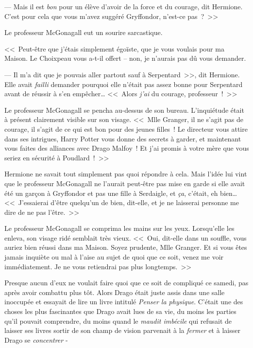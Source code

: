 --- Mais il est \emph{bon} pour un élève d'avoir de la force et du courage, dit Hermione. C'est pour cela que vous m'avez suggéré Gryffondor, n'est-ce pas~?~>>

Le professeur McGonagall eut un sourire sarcastique.

<<~Peut-être que j'étais simplement égoïste, que je vous voulais pour ma Maison. Le Choixpeau vous a-t-il offert -- non, je n'aurais pas dû vous demander.

--- Il m'a dit que je pouvais aller partout sauf à Serpentard~>>, dit Hermione. Elle avait \emph{failli} demander pourquoi elle n'était pas assez bonne pour Serpentard avant de réussir à s'en empêcher… <<~Alors \emph{j'ai} du courage, professeur~!~>>

Le professeur McGonagall se pencha au-dessus de son bureau. L'inquiétude était à présent clairement visible sur son visage. <<~Mlle Granger, il ne s'agit pas de courage, il s'agit de ce qui est bon pour des jeunes filles~! Le directeur vous attire dans ses intrigues, Harry Potter vous donne des secrets à garder, et maintenant vous faites des alliances avec Drago Malfoy~! Et j'ai promis à votre mère que vous seriez en sécurité à Poudlard~!~>>

Hermione ne savait tout simplement pas quoi répondre à cela. Mais l'idée lui vint que le professeur McGonagall ne l'aurait peut-être pas mise en garde si elle avait été un garçon à Gryffondor et pas une fille à Serdaigle, et \emph{ça}, c'était, eh bien… <<~J'essaierai d'être quelqu'un de bien, dit-elle, et je ne laisserai personne me dire de ne pas l'être.~>>

Le professeur McGonagall se comprima les mains sur les yeux. Lorsqu'elle les enleva, son visage ridé semblait très vieux. <<~Oui, dit-elle dans un souffle, vous auriez bien réussi dans ma Maison. Soyez prudente, Mlle Granger. Et si vous êtes jamais inquiète ou mal à l'aise au sujet de quoi que ce soit, venez me voir immédiatement. Je ne vous retiendrai pas plus longtemps.~>>


Presque aucun d'eux ne voulait faire quoi que ce soit de compliqué ce samedi, pas après avoir combattu plus tôt. Alors Drago était juste assis dans une salle inoccupée et essayait de lire un livre intitulé \emph{Penser la physique}. C'était une des choses les plus fascinantes que Drago avait lues de sa vie, du moins les parties qu'il pouvait comprendre, du moins quand le \emph{maudit imbécile} qui refusait de laisser ses livres sortir de son champ de vision parvenait à la \emph{fermer} et à laisser Drago se \emph{concentrer} -


